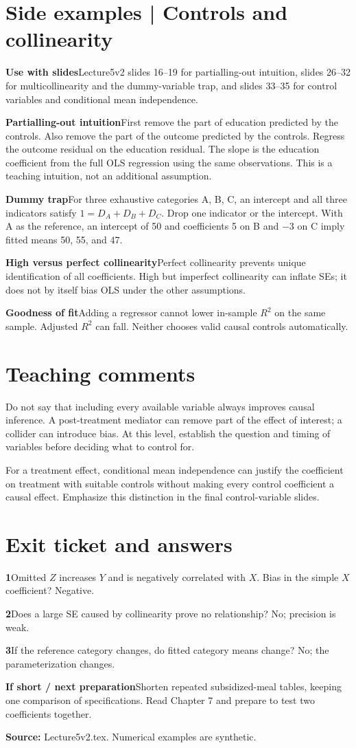 \documentclass[11pt,a4paper]{article}
\newcommand{\heading}[1]{\section*{\color{accent}#1}}
\newcommand{\cue}[2]{\par\noindent\textbf{#1}\quad #2\par}
\begin{document}
\newpage
\heading{Side examples | Controls and collinearity}
\cue{Use with slides}{Lecture5v2 slides 16--19 for partialling-out intuition, slides 26--32 for multicollinearity and the dummy-variable trap, and slides 33--35 for control variables and conditional mean independence.}
\cue{Partialling-out intuition}{First remove the part of education predicted by the controls. Also remove the part of the outcome predicted by the controls. Regress the outcome residual on the education residual. The slope is the education coefficient from the full OLS regression using the same observations. This is a teaching intuition, not an additional assumption.}
\cue{Dummy trap}{For three exhaustive categories A, B, C, an intercept and all three indicators satisfy $1=D_A+D_B+D_C$. Drop one indicator or the intercept. With A as the reference, an intercept of 50 and coefficients 5 on B and $-3$ on C imply fitted means 50, 55, and 47.}
\cue{High versus perfect collinearity}{Perfect collinearity prevents unique identification of all coefficients. High but imperfect collinearity can inflate SEs; it does not by itself bias OLS under the other assumptions.}
\cue{Goodness of fit}{Adding a regressor cannot lower in-sample $R^2$ on the same sample. Adjusted $R^2$ can fall. Neither chooses valid causal controls automatically.}
\heading{Teaching comments}
Do not say that including every available variable always improves causal inference. A post-treatment mediator can remove part of the effect of interest; a collider can introduce bias. At this level, establish the question and timing of variables before deciding what to control for.

For a treatment effect, conditional mean independence can justify the coefficient on treatment with suitable controls without making every control coefficient a causal effect. Emphasize this distinction in the final control-variable slides.
\heading{Exit ticket and answers}
\cue{1}{Omitted $Z$ increases $Y$ and is negatively correlated with $X$. Bias in the simple $X$ coefficient? Negative.}
\cue{2}{Does a large SE caused by collinearity prove no relationship? No; precision is weak.}
\cue{3}{If the reference category changes, do fitted category means change? No; the parameterization changes.}
\cue{If short / next preparation}{Shorten repeated subsidized-meal tables, keeping one comparison of specifications. Read Chapter 7 and prepare to test two coefficients together.}
\textbf{Source:} Lecture5v2.tex. Numerical examples are synthetic.
\end{document}
